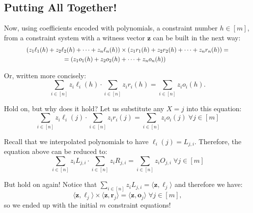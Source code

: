 \documentclass[../lecture-notes-148x210.tex]{subfiles}
\begin{document}
\subsection{Putting All Together!}

Now, using coefficients encoded with polynomials, a constraint number $h \in
[m]$, from a constraint system with a witness vector $\mathbf{z}$ can be built
in the next way:
\begin{equation*} 
    \scalebox{0.9}{$
    \begin{aligned}
        (z_1\ell_1(h) + z_2\ell_2(h) + \dots + z_n\ell_n(h)) &\times (z_1r_1(h) + z_2r_2(h) + \dots + z_nr_n(h)) =\\ = (z_1o_1(h) + z_2o_2(h)& + \dots + z_no_n(h))
    \end{aligned}
    $}
\end{equation*}

Or, written more concisely:
\begin{equation*}
    \sum_{i \in [n]} z_i\ell_i(h) \cdot \sum_{i \in [n]} z_ir_i(h) = \sum_{i \in [n]} z_io_i(h).
\end{equation*}

\begin{remark}
    Hold on, but why does it hold? Let us substitute any $X=j$ into this equation:
    \begin{equation*}
        \sum_{i \in [n]} z_i\ell_i(j) \cdot \sum_{i \in [n]} z_ir_i(j) = \sum_{i \in [n]} z_io_i(j) \; \forall j \in [m]
    \end{equation*}

    Recall that we interpolated polynomials to have $\ell_i(j) = L_{j,i}$.
    Therefore, the equation above can be reduced to:
    \begin{equation*}
        \sum_{i \in [n]} z_iL_{j,i} \cdot \sum_{i \in [n]} z_iR_{j,i} = \sum_{i \in [n]} z_iO_{j,i} \; \forall j \in [m]
    \end{equation*}

    But hold on again! Notice that $\sum_{i \in [n]} z_iL_{j,i} = \langle \mathbf{z}, \boldsymbol{\ell}_j \rangle$ and therefore we have:
    \begin{equation*}
        \langle \mathbf{z}, \boldsymbol{\ell}_j \rangle \times \langle \mathbf{z}, \boldsymbol{r}_j \rangle = \langle \mathbf{z}, \boldsymbol{o}_j \rangle \; \forall j \in [m],
    \end{equation*}
    so we ended up with the initial $m$ constraint equations!
\end{remark}
\end{document}
